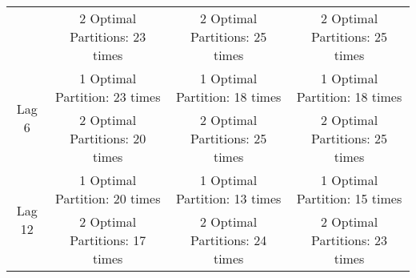\begin{table}[!h]
\begin{tabular}{lccc}
    \multicolumn{1}{c|}{}                              & \multirow{2}{*}{2 Optimal Partitions: 23 times}    & \multirow{2}{*}{2 Optimal Partitions: 25 times}   & \multirow{2}{*}{2 Optimal Partitions: 25 times}\\
    \multicolumn{1}{c|}{}                              &                                                    &                                                   & \\ \cline{1-4}
    \multicolumn{1}{c|}{\multirow{4}{*}{Lag 6}}       & \multirow{2}{*}{1 Optimal Partition: 23 times}     & \multirow{2}{*}{1 Optimal Partition: 18 times}    & \multirow{2}{*}{1 Optimal Partition: 18 times}\\ 
    \multicolumn{1}{c|}{}                               &                                                    &                                                   & \\
    \multicolumn{1}{c|}{}                              & \multirow{2}{*}{2 Optimal Partitions: 20 times}    & \multirow{2}{*}{2 Optimal Partitions: 25 times}   & \multirow{2}{*}{2 Optimal Partitions: 25 times}\\
    \multicolumn{1}{c|}{}                              &                                                    &                                                   & \\ \cline{1-4}
    
    \multicolumn{1}{c|}{\multirow{4}{*}{Lag 12}}       & \multirow{2}{*}{1 Optimal Partition: 20 times}     & \multirow{2}{*}{1 Optimal Partition: 13 times}    & \multirow{2}{*}{1 Optimal Partition: 15 times}\\ 
    \multicolumn{1}{c|}{}                               &                                                    &                                                   & \\
    \multicolumn{1}{c|}{}                              & \multirow{2}{*}{2 Optimal Partitions: 17 times}    & \multirow{2}{*}{2 Optimal Partitions: 24 times}   & \multirow{2}{*}{2 Optimal Partitions: 23 times}\\
    \multicolumn{1}{c|}{}                              &                                                    &                                                   & \\    
    \bottomrule
  \end{tabular}
  \label{table:OptimalNumberSplits}
  \vspace{1em}  
\end{table}


